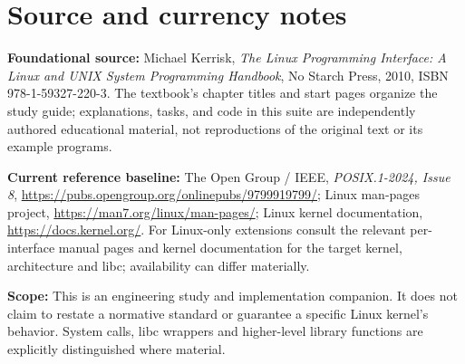 \documentclass[11pt,letterpaper,oneside]{report}
\begin{document}
\chapter*{Source and currency notes}
\textbf{Foundational source:} Michael Kerrisk, \emph{The Linux Programming Interface: A Linux and UNIX System Programming Handbook}, No Starch Press, 2010, ISBN 978-1-59327-220-3. The textbook's chapter titles and start pages organize the study guide; explanations, tasks, and code in this suite are independently authored educational material, not reproductions of the original text or its example programs.

\textbf{Current reference baseline:} The Open Group / IEEE, \emph{POSIX.1-2024, Issue 8}, \url{https://pubs.opengroup.org/onlinepubs/9799919799/}; Linux man-pages project, \url{https://man7.org/linux/man-pages/}; Linux kernel documentation, \url{https://docs.kernel.org/}. For Linux-only extensions consult the relevant per-interface manual pages and kernel documentation for the target kernel, architecture and libc; availability can differ materially.

\textbf{Scope:} This is an engineering study and implementation companion. It does not claim to restate a normative standard or guarantee a specific Linux kernel's behavior. System calls, libc wrappers and higher-level library functions are explicitly distinguished where material.
\end{document}
